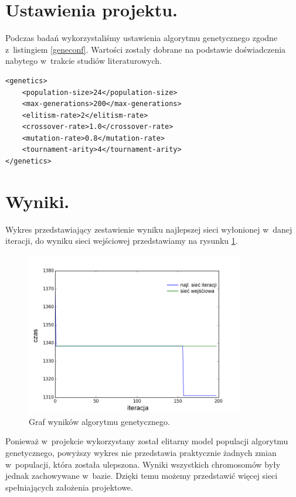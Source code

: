 \documentclass[twoside,12pt]{report}
\begin{document}
\section{Ustawienia projektu.}

Podczas badań wykorzystaliśmy ustawienia algorytmu genetycznego zgodne z~listingiem \ref{geneconf}. Wartości zostały dobrane na podstawie doświadczenia nabytego w~trakcie studiów literaturowych. 
	
\begin{lstlisting}[caption=Ustawienia algorytmu genetycznego podczas badań.,label=geneconf]
<genetics>
	<population-size>24</population-size>
	<max-generations>200</max-generations>
	<elitism-rate>2</elitism-rate>
	<crossover-rate>1.0</crossover-rate>
	<mutation-rate>0.8</mutation-rate>
	<tournament-arity>4</tournament-arity>
</genetics>
\end{lstlisting}

\clearpage
\section{Wyniki.}

Wykres przedstawiający zestawienie wyniku najlepszej sieci wyłonionej w~danej iteracji, do wyniku sieci wejściowej przedstawiamy na rysunku \ref{def_fitness}.

\begin{figure}[ht]
\centering
\includegraphics[width=0.85\textwidth]{img/fitness}
\caption{Graf wyników algorytmu genetycznego.}
\label{def_fitness}
\end{figure}

Ponieważ w~projekcie wykorzystany został elitarny model populacji algorytmu genetycznego, powyższy wykres nie przedstawia praktycznie żadnych zmian w~populacji, która została ulepszona. Wyniki wszystkich chromosomów były jednak zachowywane w~bazie. Dzięki temu możemy przedstawić więcej sieci spełniających założenia projektowe.
\end{document}
